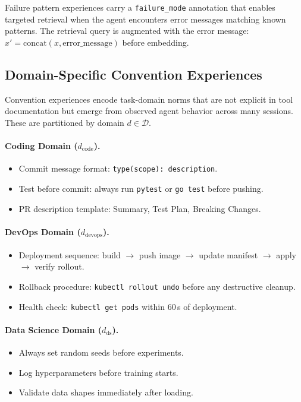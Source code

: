 \documentclass[11pt]{article}
\begin{document}
Failure pattern experiences carry a \texttt{failure\_mode} annotation that
enables targeted retrieval when the agent encounters error messages matching
known patterns. The retrieval query is augmented with the error message:
$x' = \text{concat}(x, \text{error\_message})$ before embedding.

\subsection{Domain-Specific Convention Experiences}

Convention experiences encode task-domain norms that are not explicit in tool
documentation but emerge from observed agent behavior across many sessions.
These are partitioned by domain $d \in \mathcal{D}$.

\paragraph{Coding Domain ($d_{\text{code}}$).}
\begin{itemize}[leftmargin=1.5em]
    \item Commit message format: \texttt{type(scope): description}.
    \item Test before commit: always run \texttt{pytest} or \texttt{go test}
          before pushing.
    \item PR description template: Summary, Test Plan, Breaking Changes.
\end{itemize}

\paragraph{DevOps Domain ($d_{\text{devops}}$).}
\begin{itemize}[leftmargin=1.5em]
    \item Deployment sequence: build $\to$ push image $\to$ update manifest
          $\to$ apply $\to$ verify rollout.
    \item Rollback procedure: \texttt{kubectl rollout undo} before any
          destructive cleanup.
    \item Health check: \texttt{kubectl get pods} within 60\,s of deployment.
\end{itemize}

\paragraph{Data Science Domain ($d_{\text{ds}}$).}
\begin{itemize}[leftmargin=1.5em]
    \item Always set random seeds before experiments.
    \item Log hyperparameters before training starts.
    \item Validate data shapes immediately after loading.
\end{itemize}
\end{document}

